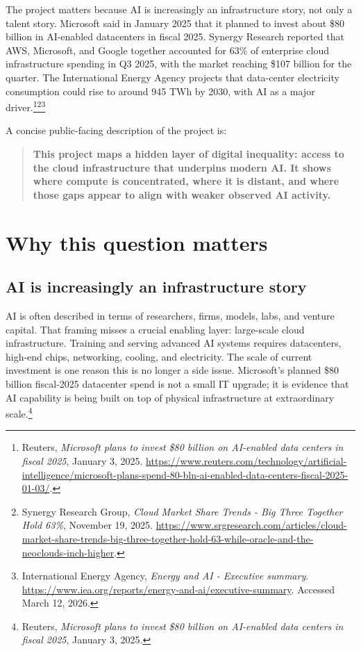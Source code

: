 \documentclass[11pt]{article}
\begin{document}
The project matters because AI is increasingly an infrastructure story, not only a talent story. Microsoft said in January 2025 that it planned to invest about \$80 billion in AI-enabled datacenters in fiscal 2025. Synergy Research reported that AWS, Microsoft, and Google together accounted for 63\% of enterprise cloud infrastructure spending in Q3 2025, with the market reaching \$107 billion for the quarter. The International Energy Agency projects that data-center electricity consumption could rise to around 945 TWh by 2030, with AI as a major driver.\footnote{Reuters, \emph{Microsoft plans to invest \$80 billion on AI-enabled data centers in fiscal 2025}, January 3, 2025. \url{https://www.reuters.com/technology/artificial-intelligence/microsoft-plans-spend-80-bln-ai-enabled-data-centers-fiscal-2025-01-03/}.}\footnote{Synergy Research Group, \emph{Cloud Market Share Trends - Big Three Together Hold 63\%}, November 19, 2025. \url{https://www.srgresearch.com/articles/cloud-market-share-trends-big-three-together-hold-63-while-oracle-and-the-neoclouds-inch-higher}.}\footnote{International Energy Agency, \emph{Energy and AI - Executive summary}. \url{https://www.iea.org/reports/energy-and-ai/executive-summary}. Accessed March 12, 2026.}

A concise public-facing description of the project is:

\begin{quote}
\textbf{This project maps a hidden layer of digital inequality: access to the cloud infrastructure that underpins modern AI. It shows where compute is concentrated, where it is distant, and where those gaps appear to align with weaker observed AI activity.}
\end{quote}

\section{Why this question matters}

\subsection{AI is increasingly an infrastructure story}

AI is often described in terms of researchers, firms, models, labs, and venture capital. That framing misses a crucial enabling layer: large-scale cloud infrastructure. Training and serving advanced AI systems requires datacenters, high-end chips, networking, cooling, and electricity. The scale of current investment is one reason this is no longer a side issue. Microsoft's planned \$80 billion fiscal-2025 datacenter spend is not a small IT upgrade; it is evidence that AI capability is being built on top of physical infrastructure at extraordinary scale.\footnote{Reuters, \emph{Microsoft plans to invest \$80 billion on AI-enabled data centers in fiscal 2025}, January 3, 2025.}
\end{document}
